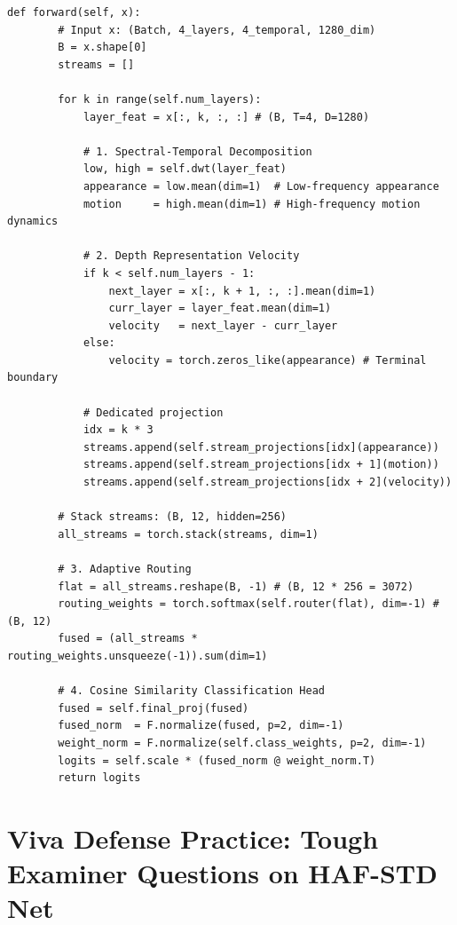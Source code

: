 \documentclass[a4paper, 11pt]{article}
\begin{document}
\begin{lstlisting}[caption={The complete PyTorch architecture of HAF-STD Net.}]
    def forward(self, x):
        # Input x: (Batch, 4_layers, 4_temporal, 1280_dim)
        B = x.shape[0]
        streams = []

        for k in range(self.num_layers):
            layer_feat = x[:, k, :, :] # (B, T=4, D=1280)

            # 1. Spectral-Temporal Decomposition
            low, high = self.dwt(layer_feat)
            appearance = low.mean(dim=1)  # Low-frequency appearance
            motion     = high.mean(dim=1) # High-frequency motion dynamics

            # 2. Depth Representation Velocity
            if k < self.num_layers - 1:
                next_layer = x[:, k + 1, :, :].mean(dim=1)
                curr_layer = layer_feat.mean(dim=1)
                velocity   = next_layer - curr_layer
            else:
                velocity = torch.zeros_like(appearance) # Terminal boundary

            # Dedicated projection
            idx = k * 3
            streams.append(self.stream_projections[idx](appearance))
            streams.append(self.stream_projections[idx + 1](motion))
            streams.append(self.stream_projections[idx + 2](velocity))

        # Stack streams: (B, 12, hidden=256)
        all_streams = torch.stack(streams, dim=1)

        # 3. Adaptive Routing
        flat = all_streams.reshape(B, -1) # (B, 12 * 256 = 3072)
        routing_weights = torch.softmax(self.router(flat), dim=-1) # (B, 12)
        fused = (all_streams * routing_weights.unsqueeze(-1)).sum(dim=1)

        # 4. Cosine Similarity Classification Head
        fused = self.final_proj(fused)
        fused_norm  = F.normalize(fused, p=2, dim=-1)
        weight_norm = F.normalize(self.class_weights, p=2, dim=-1)
        logits = self.scale * (fused_norm @ weight_norm.T)
        return logits
\end{lstlisting}

\vspace{0.3cm}

\section{Viva Defense Practice: Tough Examiner Questions on HAF-STD Net}
\end{document}
